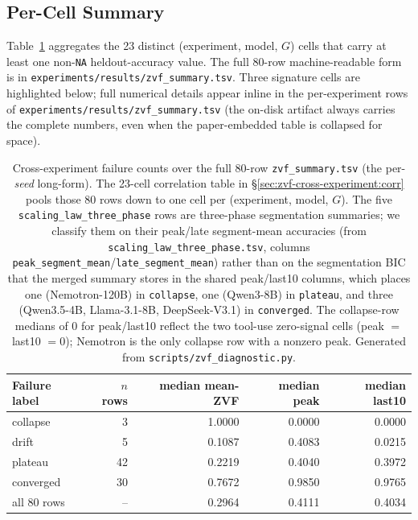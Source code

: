 \subsection{Per-Cell Summary}

Table~\ref{tab:zvf-failure-counts} aggregates the
23 distinct (experiment, model, $G$) cells that carry at least one
non-\texttt{NA} heldout-accuracy value. The full 80-row machine-readable
form is in \texttt{experiments/results/zvf\_summary.tsv}. Three
signature cells are highlighted below; full numerical details appear
inline in the per-experiment rows of
\texttt{experiments/results/zvf\_summary.tsv} (the on-disk
artifact always carries the complete numbers, even when the
paper-embedded table is collapsed for space).

\begin{table}[ht]
\centering
\small
\begin{tabular}{lrrrr}
\toprule
Failure label & $n$ rows & median mean-ZVF & median peak & median last10 \\
\midrule
collapse  &  3 & 1.0000 & 0.0000 & 0.0000 \\
drift     &  5 & 0.1087 & 0.4083 & 0.0215 \\
plateau   & 42 & 0.2219 & 0.4040 & 0.3972 \\
converged & 30 & 0.7672 & 0.9850 & 0.9765 \\
\midrule
all 80 rows & -- & 0.2964 & 0.4111 & 0.4034 \\
\bottomrule
\end{tabular}
\caption{Cross-experiment failure counts over the full 80-row
\texttt{zvf\_summary.tsv} (the per-\emph{seed} long-form). The
23-cell correlation table in \S\ref{sec:zvf-cross-experiment:corr}
pools those 80 rows down to one cell per (experiment, model, $G$).
The five \texttt{scaling\_law\_three\_phase} rows are three-phase
segmentation summaries; we classify them on their peak/late
segment-mean accuracies (from
\texttt{scaling\_law\_three\_phase.tsv}, columns
\texttt{peak\_segment\_mean}/\texttt{late\_segment\_mean}) rather than
on the segmentation BIC that the merged summary stores in the shared
peak/last10 columns, which places one (Nemotron-120B) in
\texttt{collapse}, one (Qwen3-8B) in \texttt{plateau}, and three
(Qwen3.5-4B, Llama-3.1-8B, DeepSeek-V3.1) in \texttt{converged}. The
collapse-row medians of $0$ for peak/last10 reflect the two tool-use
zero-signal cells (peak $=$ last10 $= 0$); Nemotron is the only
collapse row with a nonzero peak. Generated from
\texttt{scripts/zvf\_diagnostic.py}.}
\label{tab:zvf-failure-counts}
\end{table}

